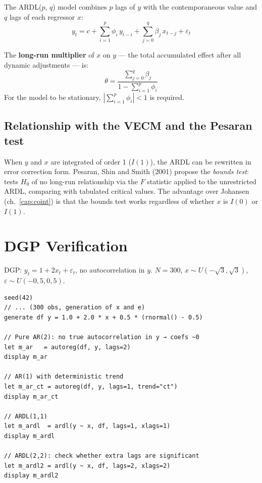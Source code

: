 The ARDL($p$, $q$) model combines $p$ lags of $y$ with the
contemporaneous value and $q$ lags of each regressor $x$:
\[
  y_t = c
        + \sum_{i=1}^p \phi_i\, y_{t-i}
        + \sum_{j=0}^q \beta_j\, x_{t-j}
        + \varepsilon_t
\]

The \textbf{long-run multiplier} of $x$ on $y$ — the total accumulated
effect after all dynamic adjustments — is:
\[
  \theta = \frac{\sum_{j=0}^q \beta_j}{1 - \sum_{i=1}^p \phi_i}
\]
For the model to be stationary, $\left|\sum_{i=1}^p \phi_i\right| < 1$ is required.

\subsection*{Relationship with the VECM and the Pesaran test}

When $y$ and $x$ are integrated of order 1 ($I(1)$), the ARDL can be
rewritten in error correction form. Pesaran, Shin and Smith (2001)
propose the \emph{bounds test}: tests $H_0$ of no long-run relationship
via the $F$ statistic applied to the unrestricted ARDL, comparing with
tabulated critical values. The advantage over Johansen (ch.~\ref{cap:coint}) is that
the bounds test works regardless of whether $x$ is $I(0)$ or $I(1)$.

\section{DGP Verification}

DGP: $y_t = 1 + 2x_t + \varepsilon_t$, no autocorrelation in $y$.
$N = 300$, $x \sim U(-\sqrt{3}, \sqrt{3})$, $\varepsilon \sim U(-0{,}5, 0{,}5)$.

\begin{lstlisting}[caption={AutoReg and ARDL}]
seed(42)
// ... (300 obs, generation of x and e)
generate df y = 1.0 + 2.0 * x + 0.5 * (rnormal() - 0.5)

// Pure AR(2): no true autocorrelation in y → coefs ~0
let m_ar   = autoreg(df, y, lags=2)
display m_ar

// AR(1) with deterministic trend
let m_ar_ct = autoreg(df, y, lags=1, trend="ct")
display m_ar_ct

// ARDL(1,1)
let m_ardl  = ardl(y ~ x, df, lags=1, xlags=1)
display m_ardl

// ARDL(2,2): check whether extra lags are significant
let m_ardl2 = ardl(y ~ x, df, lags=2, xlags=2)
display m_ardl2
\end{lstlisting}


